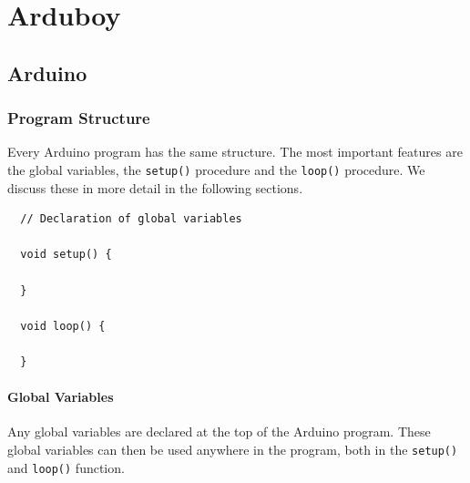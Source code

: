\documentclass[11pt,fleqn]{book} %
\begin{document}

\part{Arduboy}

\chapter{Arduino}
\section{Program Structure}
Every Arduino program has the same structure. The most important features are the global variables, the \texttt{setup()} procedure and the \texttt{loop()} procedure. We discuss these in more detail in the following sections.

\begin{definition}
	\phantom{}
	\begin{verbatim}
  // Declaration of global variables

  void setup() {

  }

  void loop() {

  }
	\end{verbatim}
	\vspace{0cm}
\end{definition}

\subsection{Global Variables}
Any global variables are declared at the top of the Arduino program. These global variables can then be used anywhere in the program, both in the \texttt{setup()} and \texttt{loop()} function.
\end{document}
